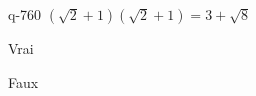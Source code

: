\begin{truefalse}{q-760}
$(\sqrt{2}+1)(\sqrt{2}+1)=3+\sqrt{8}$
\item* Vrai
\item Faux
\end{truefalse}

